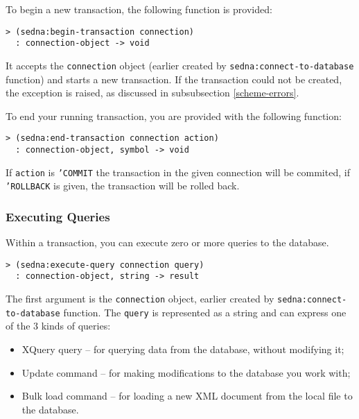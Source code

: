 \documentclass[a4paper,12pt]{article}
\newtheorem{note}{Note}
\begin{document}
To begin a new transaction, the following function is provided:

\begin{verbatim}> (sedna:begin-transaction connection)
  : connection-object -> void\end{verbatim}

It accepts the \texttt{connection} object (earlier created by
\texttt{sedna:connect-to-database} function) and starts a new transaction.
If the transaction could not be created, the exception is raised, as discussed
in subsubsection \ref{scheme-errors}.

To end your running transaction, you are provided with the following function:

\begin{verbatim}> (sedna:end-transaction connection action)
  : connection-object, symbol -> void\end{verbatim}

If \texttt{action} is \texttt{'COMMIT} the transaction in the given connection
will be commited, if \texttt{'ROLLBACK} is given, the transaction will be
rolled back.



\subsubsection{Executing Queries}

Within a transaction, you can execute zero or more queries to the database.

\begin{verbatim}> (sedna:execute-query connection query)
  : connection-object, string -> result\end{verbatim}

The first argument is the \texttt{connection} object, earlier created by
\texttt{sedna:connect-to-database} function.
The \texttt{query} is represented as a string and can express one of the 3
kinds of queries:
\begin{itemize}
\item XQuery query -- for querying data from the database, without modifying it;
\item Update command -- for making modifications to the database you work
 with;
\item Bulk load command -- for loading a new XML document from the local file to the
 database.
\end{itemize}
\end{document}
